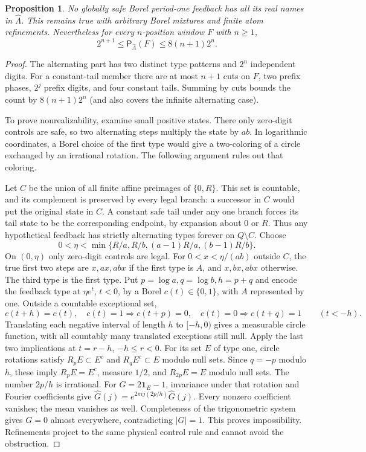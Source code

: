 \documentclass[11pt,reqno]{amsart}
\numberwithin{equation}{section}
\newtheorem{proposition}[theorem]{Proposition}
\theoremstyle{definition}
\theoremstyle{definition}
\newcommand{\Patt}{\mathsf P}
\newcommand{\one}{\mathbf 1}
\begin{document}
\begin{proposition}\label{prop:alternation}
No globally safe Borel period-one feedback has all its real names
in $\widehat\Lambda$. This remains true with arbitrary Borel
mixtures and finite atom refinements. Nevertheless for every
$n$-position window $F$ with $n\ge1$,
\[
 2^{n+1}\le\Patt_{\widehat\Lambda}(F)\le8(n+1)2^n.
\]
\end{proposition}
\begin{proof}
The alternating part has two distinct type patterns and $2^n$
independent digits. For a constant-tail member there are at most
$n+1$ cuts on $F$, two prefix phases, $2^j$ prefix digits, and
four constant tails. Summing by cuts bounds the count by
$8(n+1)2^n$ (and also covers the infinite alternating case).

To prove nonrealizability, examine small positive states. There only
zero-digit controls are safe, so two alternating steps multiply the
state by $ab$. In logarithmic coordinates, a Borel choice of the first
type would give a two-coloring of a circle exchanged by an irrational
rotation. The following argument rules out that coloring.

Let $C$ be the union of all finite affine
preimages of $\{0,R\}$. This set is countable, and its complement is preserved by every
legal branch: a successor in $C$ would put the original state in $C$. A constant safe tail under any one
branch forces its tail state to be the corresponding endpoint,
by expansion about $0$ or $R$. Thus any hypothetical feedback
has strictly alternating types forever on $Q\setminus C$.
Choose
\[
 0<\eta<\min\{R/a,R/b,(a-1)R/a,(b-1)R/b\}.
\]
On $(0,\eta)$ only zero-digit controls are legal. For
$0<x<\eta/(ab)$ outside $C$, the true first two steps are
$x,ax,abx$ if the first type is $A$, and $x,bx,abx$ otherwise.
The third type is the first type. Put $p=\log a,q=\log b,h=p+q$
and encode the feedback type at $\eta e^t$, $t<0$, by a Borel
$c(t)\in\{0,1\}$, with $A$ represented by one. Outside a
countable exceptional set,
\[
 c(t+h)=c(t),\quad
 c(t)=1\Rightarrow c(t+p)=0,\quad
 c(t)=0\Rightarrow c(t+q)=1\qquad(t<-h).
\]
Translating each negative interval of length $h$ to $[-h,0)$
gives a measurable circle function, with all countably many
translated exceptions still null. Apply the last two implications
at $t=r-h$, $-h\le r<0$. For its set $E$ of type one, circle
rotations satisfy $R_pE\subset E^c$ and $R_qE^c\subset E$
modulo null sets. Since $q=-p$ modulo $h$, these imply
$R_pE=E^c$, measure $1/2$, and $R_{2p}E=E$ modulo null sets.
The number $2p/h$ is irrational. For
$G=2\one_E-1$, invariance under that rotation and Fourier
coefficients give
$\widehat G(j)=e^{2\pi i j(2p/h)}\widehat G(j)$.
Every nonzero coefficient vanishes; the mean vanishes as well.
Completeness of the trigonometric system gives $G=0$ almost
everywhere, contradicting $|G|=1$. This proves impossibility.
Refinements project to the same physical control rule and cannot
avoid the obstruction.
\end{proof}
\end{document}
